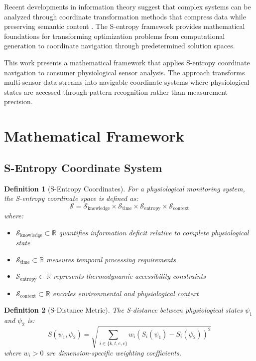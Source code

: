 \documentclass[12pt,a4paper]{article}
\newtheorem{definition}{Definition}
\begin{document}
Recent developments in information theory suggest that complex systems can be analyzed through coordinate transformation methods that compress data while preserving semantic content \cite{cover2006elements,shannon1948mathematical}. The S-entropy framework provides mathematical foundations for transforming optimization problems from computational generation to coordinate navigation through predetermined solution spaces.

This work presents a mathematical framework that applies S-entropy coordinate navigation to consumer physiological sensor analysis. The approach transforms multi-sensor data streams into navigable coordinate systems where physiological states are accessed through pattern recognition rather than measurement precision.

\section{Mathematical Framework}

\subsection{S-Entropy Coordinate System}

\begin{definition}[S-Entropy Coordinates]
For a physiological monitoring system, the S-entropy coordinate space is defined as:
\begin{equation}
\mathcal{S} = \mathcal{S}_{\text{knowledge}} \times \mathcal{S}_{\text{time}} \times \mathcal{S}_{\text{entropy}} \times \mathcal{S}_{\text{context}}
\end{equation}
where:
\begin{itemize}
\item $\mathcal{S}_{\text{knowledge}} \subset \mathbb{R}$ quantifies information deficit relative to complete physiological state
\item $\mathcal{S}_{\text{time}} \subset \mathbb{R}$ measures temporal processing requirements
\item $\mathcal{S}_{\text{entropy}} \subset \mathbb{R}$ represents thermodynamic accessibility constraints
\item $\mathcal{S}_{\text{context}} \subset \mathbb{R}$ encodes environmental and physiological context
\end{itemize}
\end{definition}

\begin{definition}[S-Distance Metric]
The S-distance between physiological states $\psi_1$ and $\psi_2$ is:
\begin{equation}
S(\psi_1, \psi_2) = \sqrt{\sum_{i \in \{k,t,e,c\}} w_i (S_i(\psi_1) - S_i(\psi_2))^2}
\end{equation}
where $w_i > 0$ are dimension-specific weighting coefficients.
\end{definition}
\end{document}
